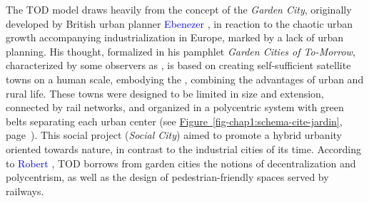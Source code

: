\begin{refsegment}
The \acrshort{TOD} model draws heavily from the concept of the \textsl{Garden City}, originally developed by British urban planner \textcolor{blue}{Ebenezer} \textcolor{blue}{\textcite{howard_-morrow_1898}}, in reaction to the chaotic urban growth accompanying industrialization in Europe, marked by a lack of urban planning. His thought, formalized in his pamphlet \textsl{Garden Cities of To-Morrow}, characterized by some observers as  \textcolor{blue}{\autocite[7]{cavin_cites-jardins_2007}}, is based on creating self-sufficient satellite towns on a human scale, embodying the  \textcolor{blue}{\autocite[9]{fath_entre_2007}}, combining the advantages of urban and rural life. These towns were designed to be limited in size and extension, connected by rail networks, and organized in a polycentric system with green belts separating each urban center (see \hyperref[fig-chap1:schema-cite-jardin]{Figure~\ref{fig-chap1:schema-cite-jardin}}, page~\pageref{fig-chap1:schema-cite-jardin}). This social project (\textsl{Social City}) aimed to promote a hybrid urbanity oriented towards nature, in contrast to the industrial cities of its time. According to \textcolor{blue}{Robert} \textcolor{blue}{\textcite[38]{fishman_open_2011}}, \acrshort{TOD} borrows from garden cities the notions of decentralization and polycentrism, as well as the design of pedestrian-friendly spaces served by railways.%


\end{refsegment}
